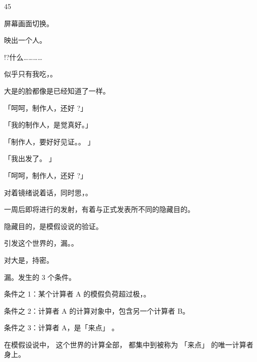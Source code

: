 45\par
屏幕画面切换。\par
映出一个人。\par
!?什么…………\par
似乎只有我吃，。\par
大是的脸都像是已经知道了一样。\par
「呵呵，制作人，还好 ?」\par
「我的制作人，是觉真好。」\par
「制作人，要好好见证。。 」\par
「我出发了。 」\par
「呵呵，制作人，还好 ?」\par
对着镜绪说着话，同时思，。\par
一周后即将进行的发射，有着与正式发表所不同的隐藏目的。\par
隐藏目的，是模假设说的验证。\par
引发这个世界的，漏。。\par
对大是，持密。\par
漏。发生的 3 个条件。\par
条件之 1：某个计算者 A 的模假负荷超过极，。\par
条件之 2：计算者 A 的计算对象中，包含另一个计算者 B。\par
条件之 3：计算者 A，是「来点」 。\par
在模假设说中， 这个世界的计算全部， 都集中到被称为 「来点」 的唯一计算者身上。\par

